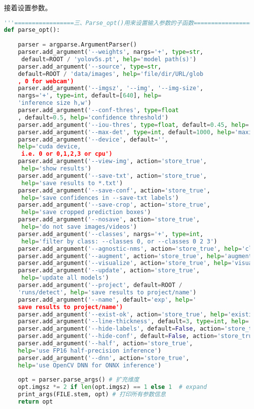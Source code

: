 接着设置参数。\begin{lstlisting}[language=python]
'''=================三、Parse_opt()用来设置输入参数的子函数==============================='''
def parse_opt():
   
    parser = argparse.ArgumentParser()
    parser.add_argument('--weights', nargs='+', type=str,
     default=ROOT / 'yolov5s.pt', help='model path(s)')
    parser.add_argument('--source', type=str, 
    default=ROOT / 'data/images', help='file/dir/URL/glob
    , 0 for webcam')
    parser.add_argument('--imgsz', '--img', '--img-size',
    nargs='+', type=int, default=[640], help=
    'inference size h,w')
    parser.add_argument('--conf-thres', type=float
    , default=0.5, help='confidence threshold')
    parser.add_argument('--iou-thres', type=float, default=0.45, help='NMS IoU threshold')
    parser.add_argument('--max-det', type=int, default=1000, help='maximum detections per image')
    parser.add_argument('--device', default='', 
    help='cuda device,
     i.e. 0 or 0,1,2,3 or cpu')
    parser.add_argument('--view-img', action='store_true',
     help='show results')
    parser.add_argument('--save-txt', action='store_true',
     help='save results to *.txt')
    parser.add_argument('--save-conf', action='store_true',
     help='save confidences in --save-txt labels')
    parser.add_argument('--save-crop', action='store_true',
     help='save cropped prediction boxes')
    parser.add_argument('--nosave', action='store_true',
     help='do not save images/videos')
    parser.add_argument('--classes', nargs='+', type=int,
     help='filter by class: --classes 0, or --classes 0 2 3')
    parser.add_argument('--agnostic-nms', action='store_true', help='class-agnostic NMS')
    parser.add_argument('--augment', action='store_true', help='augmented inference')
    parser.add_argument('--visualize', action='store_true', help='visualize features')
    parser.add_argument('--update', action='store_true',
     help='update all models')
    parser.add_argument('--project', default=ROOT / 
    'runs/detect', help='save results to project/name')
    parser.add_argument('--name', default='exp', help='
    save results to project/name')
    parser.add_argument('--exist-ok', action='store_true', help='existing project/name ok, do not increment')
    parser.add_argument('--line-thickness', default=3, type=int, help='bounding box thickness (pixels)')
    parser.add_argument('--hide-labels', default=False, action='store_true', help='hide labels')
    parser.add_argument('--hide-conf', default=False, action='store_true', help='hide confidences')
    parser.add_argument('--half', action='store_true', 
    help='use FP16 half-precision inference')
    parser.add_argument('--dnn', action='store_true', 
    help='use OpenCV DNN for ONNX inference')
 
    opt = parser.parse_args() # 扩充维度
    opt.imgsz *= 2 if len(opt.imgsz) == 1 else 1  # expand
    print_args(FILE.stem, opt) # 打印所有参数信息
    return opt
\end{lstlisting}